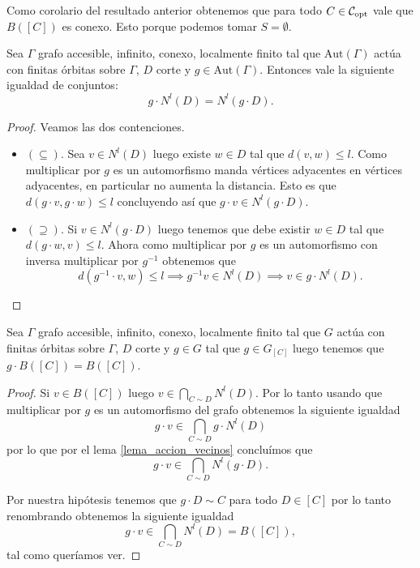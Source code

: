 \documentclass[tesis.tex]{subfiles}
\newcommand{\aut}{\text{Aut}}
\begin{document}
\begin{obs}
	Como corolario del resultado anterior obtenemos que para todo $C \in {\cal C}_{\text{opt}}$ vale que $B([C])$ es conexo.
	Esto porque podemos tomar $S = \emptyset$.
\end{obs}

\begin{lema}\label{lema_accion_vecinos}
	Sea $\Gamma$ grafo accesible, infinito, conexo, localmente finito tal que $\aut(\Gamma)$ actúa con finitas órbitas sobre $\Gamma$, $D$ corte y $g \in \aut(\Gamma)$. 
	Entonces vale la siguiente igualdad de conjuntos:
	\[
		g \cdot N^l(D) = N^l(g \cdot D).
	\]
\end{lema}

\begin{proof}
	Veamos las dos contenciones.
	
	\begin{itemize}
		\item $(\subseteq)$. 
		Sea $v \in N^l(D)$ luego existe $w \in D$ tal que $d(v,w) \le l$.
		Como multiplicar por $g$ es un automorfismo manda vértices adyacentes en vértices adyacentes, en particular no aumenta la distancia.
		Esto es que $d(g\cdot v,g\cdot w) \le l$ concluyendo así que $g \cdot v \in N^l(g \cdot D)$.  
		\item $(\supseteq)$.
		Si $v \in N^l(g\cdot D)$ luego tenemos que debe existir $w \in D$ tal que $d(g \cdot w, v) \le l$.
		Ahora como multiplicar por $g$ es un automorfismo con inversa multiplicar por $g^{-1}$ obtenemos que 
		\[
			d(g^{-1} \cdot v, w) \le l 
			\implies g^{-1}v \in N^l(D) \implies 
			 v \in g\cdot N^l(D).
		\]
	\end{itemize}
\end{proof}

\begin{lema}\label{lema_g_actua_b(C)}
	Sea $\Gamma$ grafo accesible, infinito, conexo, localmente finito tal que $G$ actúa con finitas órbitas sobre $\Gamma$, $D$ corte y $g \in G$ tal que $g \in G_{[C]}$ luego tenemos que 
	$g \cdot B([C]) = B([C])$.
\end{lema}
\begin{proof}
	Si $v \in B([C])$ luego $v \in \bigcap_{C \sim D} N^l(D)$.
	Por lo tanto usando que multiplicar por $g$ es un automorfismo del grafo obtenemos la siguiente igualdad
	\[
		g\cdot v \in \bigcap_{C \sim D} g \cdot N^l(D)
	\]
	por lo que por el lema \ref{lema_accion_vecinos} concluímos que 
	\[
		g\cdot v \in \bigcap_{C \sim D}   N^l(g\cdot D).
	\]	
	
	Por nuestra hipótesis tenemos que $g \cdot D \sim C$ para todo $D \in [C]$ por lo tanto renombrando obtenemos la siguiente igualdad
	\[
	g\cdot v \in \bigcap_{C \sim D}   N^l(D) = B([C]),
	\]
	tal como queríamos ver.
	
\end{proof}
\end{document}
